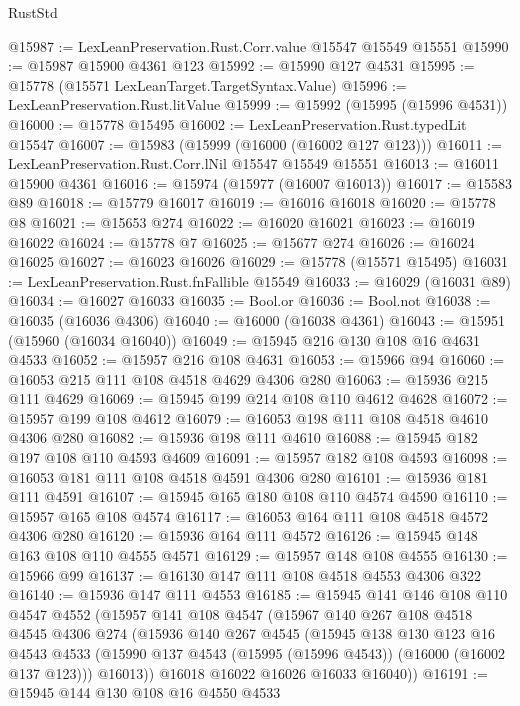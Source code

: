 \begin{lexlean}{RustStd}
\begin{coremodule}
@15987 := LexLeanPreservation.Rust.Corr.value @15547 @15549 @15551
@15990 := @15987 @15900 @4361 @123
@15992 := @15990 @127 @4531
@15995 := @15778 (@15571 LexLeanTarget.TargetSyntax.Value)
@15996 := LexLeanPreservation.Rust.litValue
@15999 := @15992 (@15995 (@15996 @4531))
@16000 := @15778 @15495
@16002 := LexLeanPreservation.Rust.typedLit @15547
@16007 := @15983 (@15999 (@16000 (@16002 @127 @123)))
@16011 := LexLeanPreservation.Rust.Corr.lNil @15547 @15549 @15551
@16013 := @16011 @15900 @4361
@16016 := @15974 (@15977 (@16007 @16013))
@16017 := @15583 @89
@16018 := @15779 @16017
@16019 := @16016 @16018
@16020 := @15778 @8
@16021 := @15653 @274
@16022 := @16020 @16021
@16023 := @16019 @16022
@16024 := @15778 @7
@16025 := @15677 @274
@16026 := @16024 @16025
@16027 := @16023 @16026
@16029 := @15778 (@15571 @15495)
@16031 := LexLeanPreservation.Rust.fnFallible @15549
@16033 := @16029 (@16031 @89)
@16034 := @16027 @16033
@16035 := Bool.or
@16036 := Bool.not
@16038 := @16035 (@16036 @4306)
@16040 := @16000 (@16038 @4361)
@16043 := @15951 (@15960 (@16034 @16040))
@16049 := @15945 @216 @130 @108 @16 @4631 @4533
@16052 := @15957 @216 @108 @4631
@16053 := @15966 @94
@16060 := @16053 @215 @111 @108 @4518 @4629 @4306 @280
@16063 := @15936 @215 @111 @4629
@16069 := @15945 @199 @214 @108 @110 @4612 @4628
@16072 := @15957 @199 @108 @4612
@16079 := @16053 @198 @111 @108 @4518 @4610 @4306 @280
@16082 := @15936 @198 @111 @4610
@16088 := @15945 @182 @197 @108 @110 @4593 @4609
@16091 := @15957 @182 @108 @4593
@16098 := @16053 @181 @111 @108 @4518 @4591 @4306 @280
@16101 := @15936 @181 @111 @4591
@16107 := @15945 @165 @180 @108 @110 @4574 @4590
@16110 := @15957 @165 @108 @4574
@16117 := @16053 @164 @111 @108 @4518 @4572 @4306 @280
@16120 := @15936 @164 @111 @4572
@16126 := @15945 @148 @163 @108 @110 @4555 @4571
@16129 := @15957 @148 @108 @4555
@16130 := @15966 @99
@16137 := @16130 @147 @111 @108 @4518 @4553 @4306 @322
@16140 := @15936 @147 @111 @4553
@16185 := @15945
    @141
    @146
    @108
    @110
    @4547
    @4552
    (@15957
      @141
      @108
      @4547
      (@15967
        @140
        @267
        @108
        @4518
        @4545
        @4306
        @274
        (@15936
          @140
          @267
          @4545
          (@15945
            @138
            @130
            @123
            @16
            @4543
            @4533
            (@15990 @137 @4543 (@15995 (@15996 @4543)) (@16000 (@16002 @137 @123)))
            @16013))
        @16018
        @16022
        @16026
        @16033
        @16040))
@16191 := @15945 @144 @130 @108 @16 @4550 @4533

\end{coremodule}
\end{lexlean}
